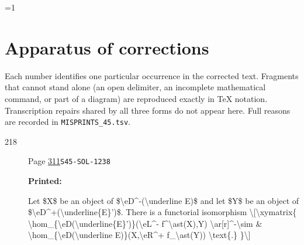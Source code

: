 \documentclass[oneside]{book}
\theoremstyle{sga-source}
\theoremstyle{sga-source-dash}
\theoremstyle{sga-source-dotdash}
\theoremstyle{sga-source-number-note-dash}
\theoremstyle{sga-source-note-number-dotdash}
\theoremstyle{sga-source-example-dotdash}
\theoremstyle{sga-source-inline-number}
\theoremstyle{sga-source-bare-number}
\theoremstyle{sga-source}
\providecommand\EditionMode{1}
\begin{document}
\ifnum\EditionMode=1\relax
\clearpage
\chapter*{Apparatus of corrections}
Each number identifies one particular occurrence in the corrected text. Fragments that cannot stand alone (an open delimiter, an incomplete mathematical command, or part of a diagram) are reproduced exactly in TeX notation. Transcription repairs shared by all three forms do not appear here. Full reasons are recorded in \texttt{MISPRINTS\_45.tsv}.
\begingroup\small
\begin{description}
\item[\hypertarget{apparatus:EN-0218}{218}] Page \hyperlink{printpage:en:311}{311}\quad\texttt{S45-SOL-1238}
\par\noindent\textbf{Printed:} {\footnotesize\ttfamily\raggedright Let \$X\$ be an object of \$\textbackslash{}\allowbreak{}eD\textasciicircum{}\allowbreak{}-\allowbreak{}(\allowbreak{}\textbackslash{}\allowbreak{}underline E)\allowbreak{}\$ and let \$Y\$ be an object of \$\textbackslash{}\allowbreak{}eD\textasciicircum{}\allowbreak{}+\allowbreak{}(\allowbreak{}\textbackslash{}\allowbreak{}underline\{\allowbreak{}E\}\allowbreak{}')\allowbreak{}\$. There is a functorial isomorphism \textbackslash{}\allowbreak{}[\allowbreak{}\textbackslash{}\allowbreak{}xymatrix\{\allowbreak{}   \textbackslash{}\allowbreak{}hom\_\allowbreak{}\{\allowbreak{}\textbackslash{}\allowbreak{}eD(\allowbreak{}\textbackslash{}\allowbreak{}underline\{\allowbreak{}E\}\allowbreak{}')\allowbreak{}\}\allowbreak{}(\allowbreak{}\textbackslash{}\allowbreak{}eL\textasciicircum{}\allowbreak{}-\allowbreak{} f\textasciicircum{}\allowbreak{}\textbackslash{}\allowbreak{}ast(\allowbreak{}X)\allowbreak{},\allowbreak{}Y)\allowbreak{} \textbackslash{}\allowbreak{}ar[\allowbreak{}r]\allowbreak{}\textasciicircum{}\allowbreak{}-\allowbreak{}\textbackslash{}\allowbreak{}sim     \& \textbackslash{}\allowbreak{}hom\_\allowbreak{}\{\allowbreak{}\textbackslash{}\allowbreak{}eD(\allowbreak{}\textbackslash{}\allowbreak{}underline E)\allowbreak{}\}\allowbreak{}(\allowbreak{}X,\allowbreak{}\textbackslash{}\allowbreak{}eR\textasciicircum{}\allowbreak{}+\allowbreak{} f\_\allowbreak{}\textbackslash{}\allowbreak{}ast(\allowbreak{}Y)\allowbreak{})\allowbreak{} \textbackslash{}\allowbreak{}text\{\allowbreak{}.\}\allowbreak{} \}\allowbreak{}\textbackslash{}\allowbreak{}]\allowbreak{}\par}

\end{description}
\end{document}
